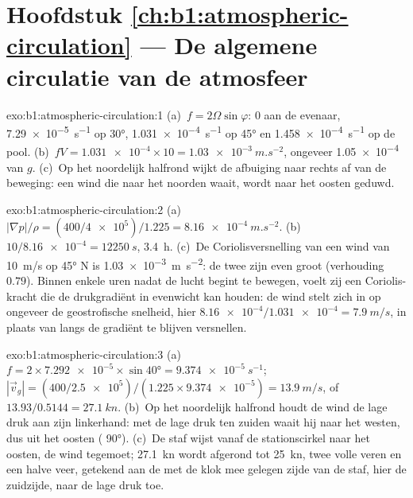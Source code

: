 \section*{Hoofdstuk \ref{ch:b1:atmospheric-circulation} --- De algemene circulatie van de atmosfeer}

\begin{solution}{exo:b1:atmospheric-circulation:1}
(a)~$f = 2\Omega\sin\varphi$: $0$ aan de evenaar, \qty{7.29e-5}{s^{-1}} op \ang{30},
\qty{1.031e-4}{s^{-1}} op \ang{45} en \qty{1.458e-4}{s^{-1}} op de pool.
(b)~$fV = \num{1.031e-4} \times 10 = \qty{1.03e-3}{m.s^{-2}}$, ongeveer \num{1.05e-4}
van $g$. (c)~Op het noordelijk halfrond wijkt de afbuiging naar rechts af van de beweging: een wind die naar het noorden waait, wordt naar het oosten geduwd.
\end{solution}

\begin{solution}{exo:b1:atmospheric-circulation:2}
(a)~$|\nabla p|/\rho = (400/\num{4e5})/1.225 = \qty{8.16e-4}{m.s^{-2}}$.
(b)~$10/\num{8.16e-4} = \qty{12250}{s}$, \qty{3.4}{h}. (c)~De Coriolisversnelling
van een wind van \qty{10}{m/s} op \ang{45} N is \qty{1.03e-3}{m.s^{-2}}: de twee zijn even groot
(verhouding $0.79$). Binnen enkele uren nadat de lucht begint te bewegen, voelt zij een Coriolis-kracht die de drukgradiënt in evenwicht kan houden: de wind stelt zich in op ongeveer de geostrofische snelheid, hier $\num{8.16e-4}/\num{1.031e-4} = \qty{7.9}{m/s}$, in plaats van langs de gradiënt te blijven versnellen.
\end{solution}

\begin{solution}{exo:b1:atmospheric-circulation:3}
(a)~$f = 2 \times \num{7.292e-5} \times \sin\ang{40} = \qty{9.374e-5}{s^{-1}}$;
$|\vec v_g| = (400/\num{2.5e5})/(1.225 \times \num{9.374e-5}) = \qty{13.9}{m/s}$, of
$13.93/0.5144 = \qty{27.1}{kn}$. (b)~Op het noordelijk halfrond houdt de wind de lage druk aan zijn linkerhand: met de lage druk ten zuiden waait hij naar het westen, dus uit het oosten
( \ang{90}). (c)~De staf wijst vanaf de stationscirkel naar het oosten, de wind tegemoet; \qty{27.1}{kn} wordt afgerond tot \qty{25}{kn}, twee volle veren en een halve veer, getekend aan de met de klok mee gelegen zijde van de staf, hier de zuidzijde, naar de lage druk toe.
\end{solution}

